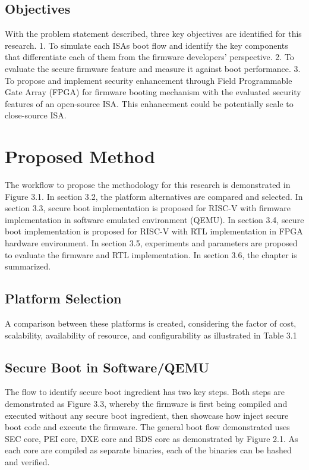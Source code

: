 \documentclass[a4paper,fleqn]{cas-dc}
\begin{document}
\subsection{ Objectives}
With the problem statement described, three key objectives are identified for this research.
1.	To simulate each ISAs boot flow and identify the key components that differentiate each of them from the firmware developers’ perspective.
2.	To evaluate the secure firmware feature and measure it against boot performance.
3.	To propose and implement security enhancement through Field Programmable Gate Array (FPGA) for firmware booting mechanism with the evaluated security features of an open-source ISA. This enhancement could be potentially scale to close-source ISA.


\section{ Proposed Method}
The workflow to propose the methodology for this research is demonstrated in Figure 3.1. In section 3.2, the platform alternatives are compared and selected. In section 3.3, secure boot implementation is proposed for RISC-V with firmware implementation in software emulated environment (QEMU). In section 3.4, secure boot implementation is proposed for RISC-V with RTL implementation in FPGA hardware environment. In section 3.5, experiments and parameters are proposed to evaluate the firmware and RTL implementation. In section 3.6, the chapter is summarized.

\subsection{ Platform Selection}
A comparison between these platforms is created, considering the factor of cost, scalability, availability of resource, and configurability as illustrated in Table 3.1


\subsection{ Secure Boot in Software/QEMU}
The flow to identify secure boot ingredient has two key steps. Both steps are demonstrated as Figure 3.3, whereby the firmware is first being compiled and executed without any secure boot ingredient, then showcase how inject secure boot code and execute the firmware. The general boot flow demonstrated uses SEC core, PEI core, DXE core and BDS core as demonstrated by Figure 2.1. As each core are compiled as separate binaries, each of the binaries can be hashed and verified.
\end{document}

